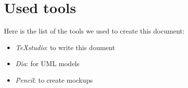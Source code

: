 \pagebreak
\section{Used tools}
Here is the list of the tools we used to create this document:

\newcommand{\tool}[2]{
	\item 
		\textit{ #1}: #2	
}


\begin{itemize}
	\tool {TeXstudio}{to write this doument}
	\tool {Dia}{for UML models}
	\tool{Pencil}{to create mockups}
\end{itemize}